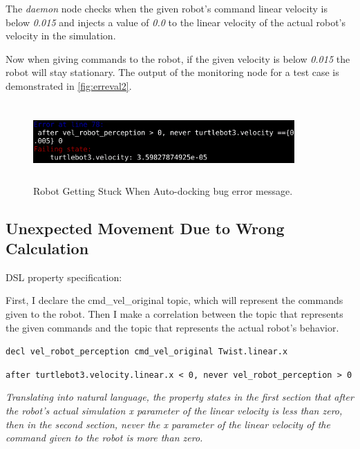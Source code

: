The \textit{daemon} node checks when the given robot's command linear velocity is below \textit{0.015} and injects a value of \textit{0.0} to the linear velocity of the actual robot's velocity in the simulation.

Now when giving commands to the robot, if the given velocity is below \textit{0.015} the robot will stay stationary. The output of the monitoring node for a test case is demonstrated in \autoref{fig:erreval2}.

\begin{figure}[htb]
\begin{center}
\includegraphics[width=10cm,height=3cm,keepaspectratio,]{images/erreval2.png}
\caption{Robot Getting Stuck When Auto-docking bug error message.} \label{fig:erreval2}
\end{center}
\end{figure}


\subsection{Unexpected Movement Due to Wrong Calculation}
\label{ssec:unexpectedmovementduetowrongcalculation}

DSL property specification:

First, I declare the cmd\_vel\_original topic, which will represent the commands given to the robot.
Then I make a correlation between the topic that represents the given commands and the topic that represents the actual robot's behavior.

\texttt{decl vel\_robot\_perception cmd\_vel\_original Twist.linear.x}

\texttt{after turtlebot3.velocity.linear.x < 0, never vel\_robot\_perception > 0}

\textit{Translating into natural language, the property states in the first section that after the robot's actual simulation x parameter of the linear velocity is less than zero, then in the second section, never the x parameter of the linear velocity of the command given to the robot is more than zero.}

